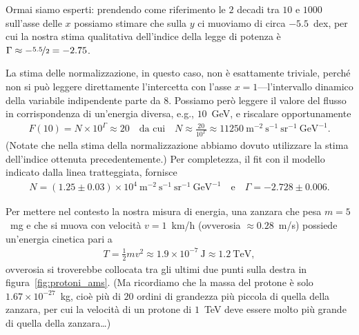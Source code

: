 \begin{solution}

\begin{center}
    
\end{center}

Ormai siamo esperti: prendendo come riferimento le $2$ decadi tra $10$ e $1000$
sull'asse delle $x$ possiamo stimare che sulla $y$ ci muoviamo di circa $-5.5$~dex,
per cui la nostra stima qualitativa dell'indice della legge di potenza è
$\Gamma \approx -\nicefrac{5.5}{2} = -2.75$.

La stima delle normalizzazione, in questo caso, non è esattamente triviale,
perché non si può leggere direttamente l'intercetta con l'asse $x=1$---l'intervallo
dinamico della variabile indipendente parte da $8$. Possiamo però leggere
il valore del flusso in corrispondenza di un'energia diversa, e.g., $10$~GeV,
e riscalare opportunamente
\begin{align*}
  F(10) = N \times 10^\Gamma \approx 20 \quad \text{da cui} \quad
  N \approx \frac{20}{10^\Gamma} \approx
  11250~\text{m}^{-2}~\text{s}^{-1}~\text{sr}^{-1}~\text{GeV}^{-1}.
\end{align*}
(Notate che nella stima della normalizzazione abbiamo dovuto utilizzare la stima
dell'indice ottenuta precedentemente.) Per completezza, il fit con il modello
indicato dalla linea tratteggiata, fornisce
\begin{align*}
  N = (1.25 \pm 0.03) \times 10^4~\text{m}^{-2}~\text{s}^{-1}~\text{sr}^{-1}~\text{GeV}^{-1}
  \quad \text{e} \quad \Gamma = -2.728 \pm 0.006.
\end{align*}

Per mettere nel contesto la nostra misura di energia, una zanzara che pesa
$m = 5$~mg e che si muova con velocità $v = 1$~km/h (ovverosia $\approx 0.28$~m/s)
possiede un'energia cinetica pari a
\begin{align*}
  T = \frac{1}{2}mv^2 \approx 1.9 \times 10^{-7}~\text{J} \approx 1.2~\text{TeV},
\end{align*}
ovverosia si troverebbe collocata tra gli ultimi due punti sulla destra in
figura~\ref{fig:protoni_ams}. (Ma ricordiamo che la massa del protone è solo
$1.67 \times 10^{-27}$~kg, cioè più di $20$ ordini di grandezza più piccola
di quella della zanzara, per cui la velocità di un protone di $1$~TeV deve
essere molto più grande di quella della zanzara\ldots)


\end{solution}
